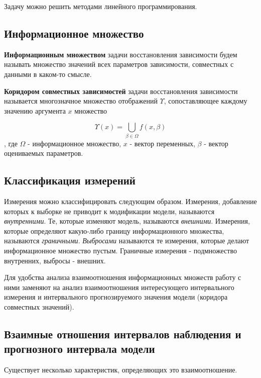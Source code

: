 \documentclass[12pt,a4paper]{article}
\begin{document}
                Задачу можно решить методами линейного программирования.
            
                \subsection{Информационное множество}
                \textbf{Информационным множеством} задачи восстановления зависимости
                будем называть множество значений всех параметров зависимости,
                совместных с данными в каком-то смысле. 
            
                \textbf{Коридором совместных зависимостей} задачи восстановления зависимости
                называется многозначное множество отображений $ \Upsilon $, сопоставляющее
                каждому значению аргумента $ x $ множество
                
                \begin{equation}
                    \Upsilon(x) = \bigcup_{\beta \in \Omega} f(x, \beta)
                \end{equation}
                , где $ \Omega $ - информационное множество, $ x $ - вектор переменных, $ \beta $ - вектор оцениваемых параметров. 

            \subsection{Классификация измерений}
                Измерения можно классифицировать следующим образом.
                Измерения, добавление которых к выборке не приводит к модификации модели, называются \textsl{внутренними}.
                Те, которые изменяют модель, называются \textsl{внешними}.
                Измерения, которые определяют какую-либо границу информационного множества, называются \textsl{граничными}.
                \textsl{Выбросами} называются те измерения, которые делают информационное множество пустым.
                Граничные измерения - подмножество внутренних, выбросы - внешних.
            
                Для удобства анализа взаимоотношения информационных множеств работу с ними заменяют
                на анализ взаимоотношения интересующего интервального измерения и интервального прогнозируемого
                значения модели (коридора совместных значений).
            
                \subsection{Взаимные отношения интервалов наблюдения и прогнозного интервала модели}
                \quad Существует несколько характеристик, определяющих это взаимоотношение.
            
\end{document}
